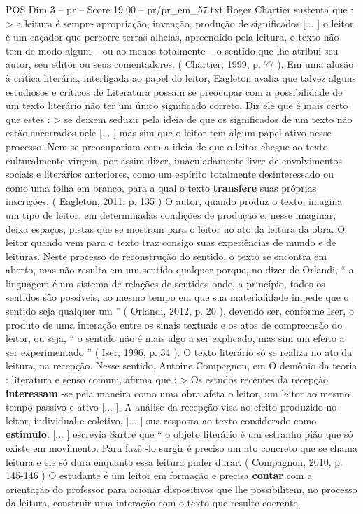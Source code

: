 \begin{textsample}{POS Dim 3 – pr – Score 19.00 – pr/pr\_em\_57.txt}
Roger Chartier sustenta que : > a leitura é sempre apropriação, invenção, produção de significados [... ] o leitor é um caçador que percorre terras alheias, apreendido pela leitura, o texto não tem de modo algum – ou ao menos totalmente – o sentido que lhe atribui seu autor, seu editor ou seus comentadores. ( Chartier, 1999, p. 77 ).
Em uma alusão à crítica literária, interligada ao papel do leitor, Eagleton avalia que talvez alguns estudiosos e críticos de Literatura possam se preocupar com a possibilidade de um texto literário não ter um único significado correto.
Diz ele que é mais certo que estes : > se deixem seduzir pela ideia de que os significados de um texto não estão encerrados nele [... ] mas sim que o leitor tem algum papel ativo nesse processo.
Nem se preocupariam com a ideia de que o leitor chegue ao texto culturalmente virgem, por assim dizer, imaculadamente livre de envolvimentos sociais e literários anteriores, como um espírito totalmente desinteressado ou como uma folha em branco, para a qual o texto \textbf{transfere} suas próprias inscrições. ( Eagleton, 2011, p. 135 ) O autor, quando produz o texto, imagina um tipo de leitor, em determinadas condições de produção e, nesse imaginar, deixa espaços, pistas que se mostram para o leitor no ato da leitura da obra.
O leitor quando vem para o texto traz consigo suas experiências de mundo e de leituras.
Neste processo de reconstrução do sentido, o texto se encontra em aberto, mas não resulta em um sentido qualquer porque, no dizer de Orlandi, “ a linguagem é um sistema de relações de sentidos onde, a princípio, todos os sentidos são possíveis, ao mesmo tempo em que sua materialidade impede que o sentido seja qualquer um ” ( Orlandi, 2012, p. 20 ), devendo ser, conforme Iser, o produto de uma interação entre os sinais textuais e os atos de compreensão do leitor, ou seja, “ o sentido não é mais algo a ser explicado, mas sim um efeito a ser experimentado ” ( Iser, 1996, p. 34 ).
O texto literário só se realiza no ato da leitura, na recepção.
Nesse sentido, Antoine Compagnon, em O demônio da teoria : literatura e senso comum, afirma que : > Os estudos recentes da recepção \textbf{interessam} -se pela maneira como uma obra afeta o leitor, um leitor ao mesmo tempo passivo e ativo [... ].
A análise da recepção visa ao efeito produzido no leitor, individual e coletivo, [... ] sua resposta ao texto considerado como \textbf{estímulo}. [... ] escrevia Sartre que “ o objeto literário é um estranho pião que só existe em movimento.
Para fazê -lo surgir é preciso um ato concreto que se chama leitura e ele só dura enquanto essa leitura puder durar. ( Compagnon, 2010, p. 145-146 ) O estudante é um leitor em formação e precisa \textbf{contar} com a orientação do professor para acionar dispositivos que lhe possibilitem, no processo da leitura, construir uma interação com o texto que resulte coerente.

\end{textsample}
